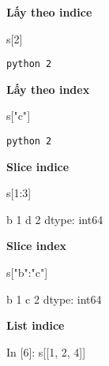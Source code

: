\documentclass[
]{book}
\newenvironment{Shaded}{\begin{snugshade}}{\end{snugshade}}
\newcommand{\DecValTok}[1]{\textcolor[rgb]{0.00,0.00,0.81}{#1}}
\newcommand{\NormalTok}[1]{#1}
\newcommand{\StringTok}[1]{\textcolor[rgb]{0.31,0.60,0.02}{#1}}
\begin{document}
\textbf{Lấy theo indice}

\begin{Shaded}
\begin{Highlighting}[]
\NormalTok{s[}\DecValTok{2}\NormalTok{]}
\end{Highlighting}
\end{Shaded}

\texttt{python\ 2}

\textbf{Lấy theo index}

\begin{Shaded}
\begin{Highlighting}[]
\NormalTok{s[}\StringTok{"c"}\NormalTok{]}
\end{Highlighting}
\end{Shaded}

\texttt{python\ 2}

\textbf{Slice indice}

\begin{Shaded}
\begin{Highlighting}[]
\NormalTok{s[}\DecValTok{1}\NormalTok{:}\DecValTok{3}\NormalTok{]}
\end{Highlighting}
\end{Shaded}

\begin{Shaded}
\begin{Highlighting}[]
\NormalTok{b    }\DecValTok{1}
\NormalTok{d    }\DecValTok{2}
\NormalTok{dtype: int64}
\end{Highlighting}
\end{Shaded}

\textbf{Slice index}

\begin{Shaded}
\begin{Highlighting}[]
\NormalTok{s[}\StringTok{"b"}\NormalTok{:}\StringTok{"c"}\NormalTok{]}
\end{Highlighting}
\end{Shaded}

\begin{Shaded}
\begin{Highlighting}[]
\NormalTok{b    }\DecValTok{1}
\NormalTok{c    }\DecValTok{2}
\NormalTok{dtype: int64}
\end{Highlighting}
\end{Shaded}

\textbf{List indice}

\begin{Shaded}
\begin{Highlighting}[]
\NormalTok{In [}\DecValTok{6}\NormalTok{]: s[[}\DecValTok{1}\NormalTok{, }\DecValTok{2}\NormalTok{, }\DecValTok{4}\NormalTok{]]}
\end{Highlighting}
\end{Shaded}
\end{document}
